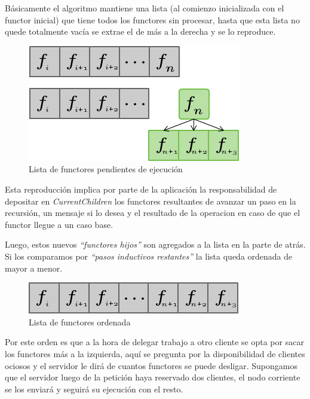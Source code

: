     Básicamente el algoritmo mantiene una lista (al comienzo inicializada con el functor inicial) que tiene todos los functores
    sin procesar, hasta que esta lista no quede totalmente vacía se extrae el de más a la derecha y se lo reproduce.\\

        \begin{figure}[!ht]
            \begin{center}
                \includegraphics[scale=0.6]{images/DRP-Alg-1.png}
            \end{center}
            \caption{Lista de functores pendientes de ejecución}
        \end{figure}

    Esta reproducción implica por parte de la aplicación la responsabilidad de depositar en \textit{CurrentChildren} los functores
    resultantes de avanzar un paso en la recursión, un mensaje si lo desea y el resultado de la operacion en caso de que el functor llegue
    a un caso base.

    Luego, estos nuevos \textit{``functores hijos''} son agregados a la lista en la parte de atrás. Si los comparamos
    por \textit{``pasos inductivos restantes''} la lista queda ordenada de mayor a menor.\\

        \begin{figure}[!ht]
            \begin{center}
                \includegraphics[scale=0.6]{images/DRP-Alg-2.png}
            \end{center}
            \caption{Lista de functores ordenada}
        \end{figure}

    Por este orden es que a la hora de delegar trabajo a otro cliente se opta por sacar los functores más a la
    izquierda, aquí se pregunta por la disponibilidad de clientes ociosos y el servidor le dirá de cuantos functores se
    puede desligar. Supongamos que el servidor luego de la petición haya reservado dos clientes, el nodo corriente se
    los enviará y seguirá su ejecución con el resto.\\

